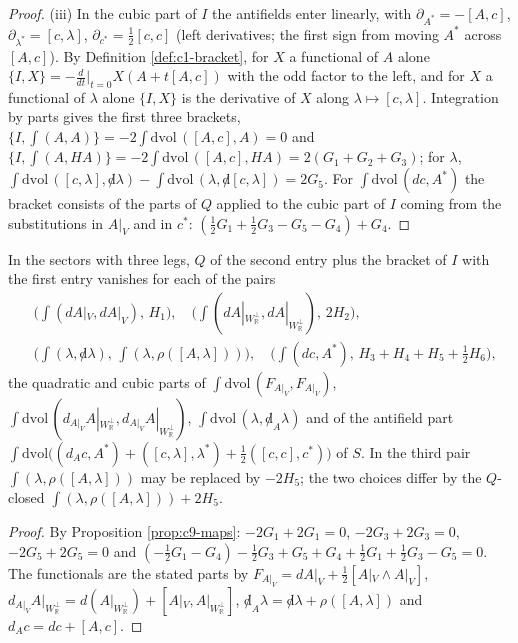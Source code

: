 \begin{proof}
(iii) In the cubic part of $I$ the antifields enter linearly, with $\partial_{A^*}=-[A,c]$, $\partial_{\lambda^*}=[c,\lambda]$, $\partial_{c^*}=\tfrac12[c,c]$ (left derivatives; the first sign from moving $A^*$ across $[A,c]$). By Definition \ref{def:c1-bracket}, for $X$ a functional of $A$ alone $\{I,X\}=-\frac{d}{dt}\big|_{t=0}X(A+t[A,c])$ with the odd factor to the left, and for $X$ a functional of $\lambda$ alone $\{I,X\}$ is the derivative of $X$ along $\lambda\mapsto[c,\lambda]$. Integration by parts gives the first three brackets, $\{I,\int(A,A)\}=-2\int\mathrm{dvol}\,([A,c],A)=0$ and $\{I,\int(A,HA)\}=-2\int\mathrm{dvol}\,([A,c],HA)=2(G_1+G_2+G_3)$; for $\lambda$, $\int\mathrm{dvol}\,([c,\lambda],{\not d}\lambda)-\int\mathrm{dvol}\,(\lambda,{\not d}[c,\lambda])=2G_5$. For $\int\mathrm{dvol}\,(dc,A^*)$ the bracket consists of the parts of $Q$ applied to the cubic part of $I$ coming from the substitutions in $A|_V$ and in $c^*$: $(\tfrac12G_1+\tfrac12G_3-G_5-G_4)+G_4$.
\end{proof}

\begin{corollary}[Completions]
\label{cor:c9-completions}
In the sectors with three legs, $Q$ of the second entry plus the bracket of $I$ with the first entry vanishes for each of the pairs
\[
\begin{aligned}
&\Big(\int(dA|_V,dA|_V),\,H_1\Big),\quad \Big(\int(dA|_{W_{\mathbb R}^\perp},dA|_{W_{\mathbb R}^\perp}),\,2H_2\Big),\\
&\Big(\int(\lambda,{\not d}\lambda),\,\int(\lambda,\rho([A,\lambda]))\Big),\quad \Big(\int(dc,A^*),\,H_3+H_4+H_5+\tfrac12H_6\Big),
\end{aligned}
\]
the quadratic and cubic parts of $\int\mathrm{dvol}\,(F_{A|_V},F_{A|_V})$, $\int\mathrm{dvol}\,(d_{A|_V}A|_{W_{\mathbb R}^\perp},d_{A|_V}A|_{W_{\mathbb R}^\perp})$, $\int\mathrm{dvol}\,(\lambda,{\not d}_A\lambda)$ and of the antifield part $\int\mathrm{dvol}\big((d_Ac,A^*)+([c,\lambda],\lambda^*)+\tfrac12([c,c],c^*)\big)$ of $S$. In the third pair $\int(\lambda,\rho([A,\lambda]))$ may be replaced by $-2H_5$; the two choices differ by the $Q$-closed $\int(\lambda,\rho([A,\lambda]))+2H_5$.
\end{corollary}

\begin{proof}
By Proposition \ref{prop:c9-maps}: $-2G_1+2G_1=0$, $-2G_3+2G_3=0$, $-2G_5+2G_5=0$ and $(-\tfrac12G_1-G_4)-\tfrac12G_3+G_5+G_4+\tfrac12G_1+\tfrac12G_3-G_5=0$. The functionals are the stated parts by $F_{A|_V}=dA|_V+\tfrac12[A|_V\wedge A|_V]$, $d_{A|_V}A|_{W_{\mathbb R}^\perp}=d(A|_{W_{\mathbb R}^\perp})+[A|_V,A|_{W_{\mathbb R}^\perp}]$, ${\not d}_A\lambda={\not d}\lambda+\rho([A,\lambda])$ and $d_Ac=dc+[A,c]$.
\end{proof}

